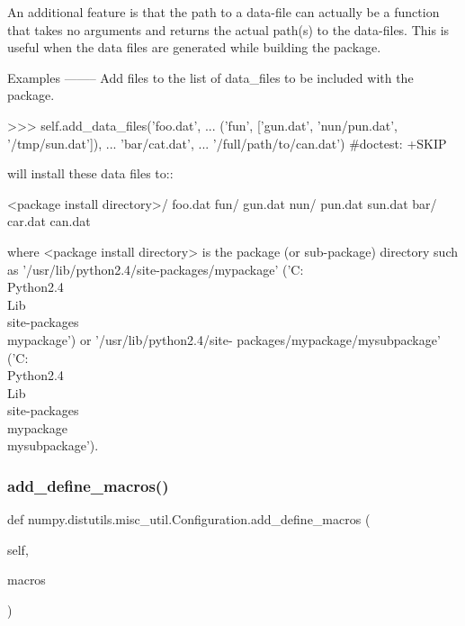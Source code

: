 \begin{DoxyVerb}
An additional feature is that the path to a data-file can actually be
a function that takes no arguments and returns the actual path(s) to
the data-files. This is useful when the data files are generated while
building the package.

Examples
--------
Add files to the list of data_files to be included with the package.

    >>> self.add_data_files('foo.dat',
    ...     ('fun', ['gun.dat', 'nun/pun.dat', '/tmp/sun.dat']),
    ...     'bar/cat.dat',
    ...     '/full/path/to/can.dat')                   #doctest: +SKIP

will install these data files to::

    <package install directory>/
     foo.dat
     fun/
       gun.dat
       nun/
 pun.dat
     sun.dat
     bar/
       car.dat
     can.dat

where <package install directory> is the package (or sub-package)
directory such as '/usr/lib/python2.4/site-packages/mypackage' ('C:
\\Python2.4 \\Lib \\site-packages \\mypackage') or
'/usr/lib/python2.4/site- packages/mypackage/mysubpackage' ('C:
\\Python2.4 \\Lib \\site-packages \\mypackage \\mysubpackage').
\end{DoxyVerb}
 \mbox{\label{classnumpy_1_1distutils_1_1misc__util_1_1Configuration_aadd5028de0b81117e8b23fd3e125bc49}} 
\subsubsection{\texorpdfstring{add\+\_\+define\+\_\+macros()}{add\_define\_macros()}}
{\footnotesize\ttfamily def numpy.\+distutils.\+misc\+\_\+util.\+Configuration.\+add\+\_\+define\+\_\+macros (\begin{DoxyParamCaption}\item[{}]{self,  }\item[{}]{macros }\end{DoxyParamCaption})}



